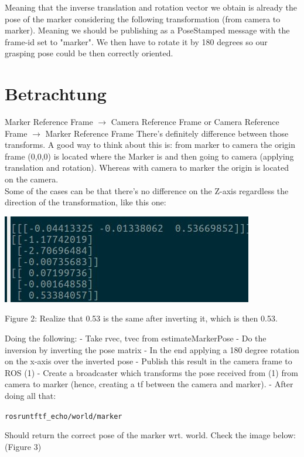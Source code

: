 \documentclass{article}
\begin{document}
Meaning that the inverse translation and rotation vector we obtain is already the pose of the marker considering the following transformation (from camera to marker). Meaning we should be publishing as a PoseStamped message with the frame-id set to "marker". We then have to rotate it by 180 degrees so our grasping pose could be then correctly oriented.

\section{Betrachtung}
Marker Reference Frame $\xrightarrow{}$ Camera Reference Frame or
Camera Reference Frame $\xrightarrow{}$ Marker Reference Frame 
There’s definitely difference between those transforms. A good way to think about this is: from marker to camera the origin frame (0,0,0) is located where the Marker is and then going to camera (applying translation and rotation). Whereas with camera to marker the origin is located on the camera. 
\\
Some of the cases can be that there’s no difference on the Z-axis regardless the direction of the transformation, like this one:
\begin{center}
  \includegraphics[scale=0.5]{pic2.jpeg}
  
  Figure 2: Realize that 0.53 is the same after inverting it, which is then 0.53.
\end{center}
Doing the following:
- Take rvec, tvec from estimateMarkerPose
- Do the inversion by inverting the pose matrix
- In the end applying a 180 degree rotation on the x-axis over the inverted pose
- Publish this result in the camera frame to ROS (1)
- Create a broadcaster which transforms the pose received from (1) from camera to marker (hence, creating a tf between the camera and marker).
- After doing all that:
\begin{alltt}
    rosrun tf tf_echo /world /marker 
\end{alltt}
Should return the correct pose of the marker wrt. world. Check the image below: (Figure 3)
\end{document}
